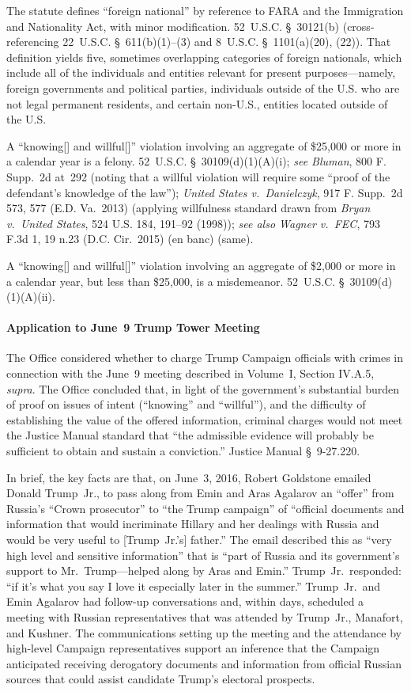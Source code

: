 The statute defines ``foreign national'' by reference to FARA and the Immigration and Nationality Act, with minor modification.
52~U.S.C. \S~30121(b) (cross-referencing 22~U.S.C. \S~611(b)(1)--(3) and 8~U.S.C. \S~1101(a)(20), (22)).
That definition yields five, sometimes overlapping categories of foreign nationals, which include all of the individuals and entities relevant for present purposes---namely, foreign governments and political parties, individuals outside of the U.S. who are not legal permanent residents, and certain non-U.S., entities located outside of the U.S.

A ``knowing[] and willful[]'' violation involving an aggregate of \$25,000 or more in a calendar year is a felony.
52~U.S.C. \S~30109(d)(1)(A)(i); \textit{see Bluman}, 800 F. Supp.~2d at~292 (noting that a willful violation will require some ``proof of the defendant's knowledge of the law''); \textit{United States v.\ Danielczyk}, 917 F. Supp.~2d 573, 577 (E.D. Va.~2013) (applying willfulness standard drawn from \textit{Bryan v.\ United States}, 524 U.S. 184, 191--92 (1998)); \textit{see also Wagner v.\ FEC}, 793 F.3d 1, 19 n.23 (D.C. Cir.~2015) (en banc) (same).

A ``knowing[] and willful[]'' violation involving an aggregate of \$2,000 or more in a calendar year, but less than \$25,000, is a misdemeanor.
52~U.S.C. \S~30109(d)(1)(A)(ii).

\paragraph{Application to June~9 Trump Tower Meeting}
The Office considered whether to charge Trump Campaign officials with crimes in connection with the June~9 meeting described in Volume~I, Section IV.A.5, \textit{supra}.
The Office concluded that, in light of the government's substantial burden of proof on issues of intent (``knowing'' and ``willful''), and the difficulty of establishing the value of the offered information, criminal charges would not meet the Justice Manual standard that ``the admissible evidence will probably be sufficient to obtain and sustain a conviction.''
Justice Manual \S~9-27.220.

In brief, the key facts are that, on June~3, 2016, Robert Goldstone emailed Donald Trump~Jr., to pass along from Emin and Aras Agalarov an ``offer'' from Russia's ``Crown prosecutor'' to ``the Trump campaign'' of ``official documents and information that would incriminate Hillary and her dealings with Russia and would be very useful to [Trump~Jr.'s] father.''
The email described this as ``very high level and sensitive information'' that is ``part of Russia and its government's support to Mr.~Trump---helped along by Aras and Emin.''
Trump~Jr.\ responded: ``if it's what you say I love it especially later in the summer.''
Trump~Jr.\ and Emin Agalarov had follow-up conversations and, within days, scheduled a meeting with Russian representatives that was attended by Trump~Jr., Manafort, and Kushner.
The communications setting up the meeting and the attendance by high-level Campaign representatives support an inference that the Campaign anticipated receiving derogatory documents and information from official Russian sources that could assist candidate Trump's electoral prospects.

